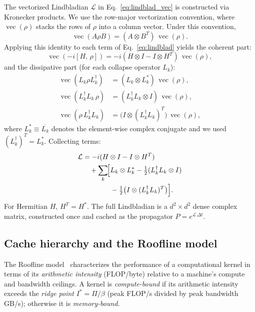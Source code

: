 \documentclass[final,3p,times,twocolumn]{elsarticle}
\newcommand{\comm}[2]{[#1,\,#2]}
\begin{document}
The vectorized Lindbladian $\mathcal{L}$ in Eq.~\eqref{eq:lindblad_vec} is
constructed via Kronecker products. We use the row-major vectorization
convention, where $\operatorname{vec}(\rho)$ stacks the rows of $\rho$ into
a column vector. Under this convention,
\begin{equation}
  \operatorname{vec}(A \rho B) = (A \otimes B^T)\,\operatorname{vec}(\rho).
\end{equation}
Applying this identity to each term of
Eq.~\eqref{eq:lindblad} yields the coherent part:
\begin{equation}
  \operatorname{vec}(-i\comm{H}{\rho})
    = -i(H \otimes I - I \otimes H^T)\,\operatorname{vec}(\rho),
\end{equation}
and the dissipative part (for each collapse operator $L_k$):
\begin{align}
  \operatorname{vec}(L_k \rho L_k^\dagger)
    &= (L_k \otimes L_k^*)\,\operatorname{vec}(\rho), \\
  \operatorname{vec}(L_k^\dagger L_k\,\rho)
    &= (L_k^\dagger L_k \otimes I)\,\operatorname{vec}(\rho), \\
  \operatorname{vec}(\rho\,L_k^\dagger L_k)
    &= \bigl(I \otimes (L_k^\dagger L_k)^T\bigr)\,\operatorname{vec}(\rho),
\end{align}
where $L_k^* \equiv \overline{L_k}$ denotes the element-wise complex
conjugate and we used $(L_k^\dagger)^T = L_k^*$. Collecting terms:
\begin{align}
  \label{eq:lindbladian_kron}
  \mathcal{L} &= -i(H \otimes I - I \otimes H^T) \nonumber\\
    &\quad + \sum_k \!\Bigl[ L_k \otimes L_k^*
       - \tfrac{1}{2}(L_k^\dagger L_k \otimes I) \nonumber\\
    &\qquad\qquad - \tfrac{1}{2}\bigl(I \otimes (L_k^\dagger L_k)^T
       \bigr) \Bigr].
\end{align}
For Hermitian $H$, $H^T = H^*$. The full Lindbladian is a
$d^2 \times d^2$ dense complex matrix, constructed once and cached as the
propagator $P = e^{\mathcal{L}\,\Delta t}$.

\subsection{Cache hierarchy and the Roofline model}
\label{sec:roofline_bg}

The Roofline model~\cite{Williams2009} characterizes the performance of a
computational kernel in terms of its \emph{arithmetic intensity}
(FLOP/byte) relative to a machine's compute and bandwidth ceilings.
A kernel is \emph{compute-bound} if its arithmetic intensity exceeds the
\emph{ridge point} $I^* = \Pi / \beta$ (peak FLOP/s divided by peak
bandwidth GB/s); otherwise it is \emph{memory-bound}.
\end{document}
